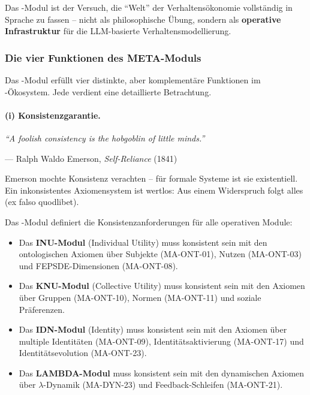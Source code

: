 Das \META-Modul ist der Versuch, die ``Welt'' der Verhaltensökonomie vollständig in Sprache zu fassen -- nicht als philosophische Übung, sondern als \textbf{operative Infrastruktur} für die LLM-basierte Verhaltensmodellierung.

\subsubsection{Die vier Funktionen des META-Moduls}

Das \META-Modul erfüllt vier distinkte, aber komplementäre Funktionen im \BCM-Ökosystem. Jede verdient eine detaillierte Betrachtung.

\paragraph{(i) Konsistenzgarantie.}

\epigraph{\textit{``A foolish consistency is the hobgoblin of little minds.''}}{--- Ralph Waldo Emerson, \textit{Self-Reliance} (1841)}

Emerson mochte Konsistenz verachten -- für formale Systeme ist sie existentiell. Ein inkonsistentes Axiomensystem ist wertlos: Aus einem Widerspruch folgt alles (ex falso quodlibet).

Das \META-Modul definiert die Konsistenzanforderungen für alle operativen Module:

\begin{itemize}
    \item Das \textbf{INU-Modul} (Individual Utility) muss konsistent sein mit den ontologischen Axiomen über Subjekte (MA-ONT-01), Nutzen (MA-ONT-03) und FEPSDE-Dimensionen (MA-ONT-08).

    \item Das \textbf{KNU-Modul} (Collective Utility) muss konsistent sein mit den Axiomen über Gruppen (MA-ONT-10), Normen (MA-ONT-11) und soziale Präferenzen.

    \item Das \textbf{IDN-Modul} (Identity) muss konsistent sein mit den Axiomen über multiple Identitäten (MA-ONT-09), Identitätsaktivierung (MA-ONT-17) und Identitätsevolution (MA-ONT-23).

    \item Das \textbf{LAMBDA-Modul} muss konsistent sein mit den dynamischen Axiomen über $\lambda$-Dynamik (MA-DYN-23) und Feedback-Schleifen (MA-ONT-21).
\end{itemize}

